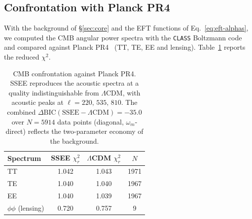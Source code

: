 \documentclass[aps,prd,preprint,amsmath,amssymb,nofootinbib,longbibliography]{revtex4-2}
\begin{document}
\subsection{Confrontation with Planck PR4}
\label{sec:cmb-confront}
With the background of \S\ref{sec:core} and the EFT functions of
Eq.~\eqref{eq:eft-alphas}, we computed the CMB angular power spectra with the
\texttt{CLASS} Boltzmann code~\citep{Lesgourgues2011} and compared against
Planck PR4~\citep{PlanckPR4} (TT, TE, EE and lensing).
Table~\ref{tab:cmb} reports the reduced $\chi^2$.

\begin{table}[t]
  \centering
  \begin{tabular}{lccc}
    \toprule
    Spectrum & SSEE $\chi^2_r$ & $\Lambda$CDM $\chi^2_r$ & $N$ \\
    \midrule
    TT          & 1.042 & 1.043 & 1971 \\
    TE          & 1.040 & 1.040 & 1967 \\
    EE          & 1.040 & 1.039 & 1967 \\
    $\phi\phi$ (lensing) & 0.720 & 0.757 & 9 \\
    \bottomrule
  \end{tabular}
  \caption{CMB confrontation against Planck PR4. SSEE reproduces the acoustic
  spectra at a quality indistinguishable from $\Lambda$CDM, with acoustic peaks
  at $\ell=220,\,535,\,810$. The combined $\Delta\mathrm{BIC}
  (\text{SSEE}-\Lambda\text{CDM})=-35.0$ over $N=5914$ data points (diagonal,
  $\omega_m$-direct) reflects the two-parameter economy of the background.}
  \label{tab:cmb}
\end{table}
\end{document}
